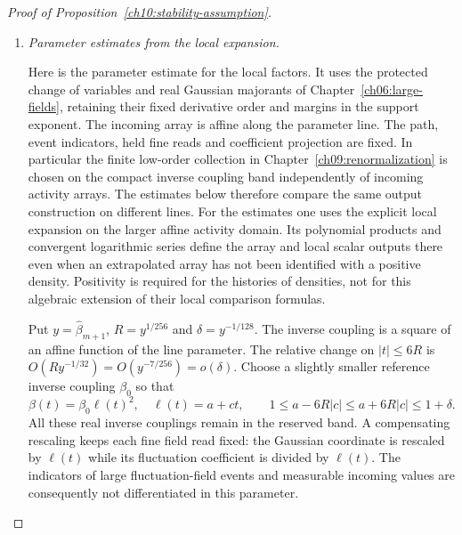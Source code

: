 \begin{proof}[Proof of Proposition~\ref{ch10:stability-assumption}]
\begin{enumerate}[label=\emph{Step \arabic*.},ref=\arabic*,leftmargin=*,align=left]
\item \emph{Parameter estimates from the local expansion.}
\label{ch10:parameter-supplier}

Here is the parameter estimate for the local factors. It uses
the protected change of variables and real Gaussian majorants of
Chapter~\ref{ch06:large-fields}, retaining their fixed derivative
order and margins in the support exponent. The incoming array is affine along the
parameter line. The path, event indicators, held fine reads and coefficient
projection are fixed. In particular the finite low-order collection in
Chapter~\ref{ch09:renormalization} is chosen on the compact inverse coupling
band independently of incoming activity arrays. The estimates below
therefore compare the same output construction on different lines.
For the estimates one uses the explicit local expansion on the larger
affine activity domain. Its polynomial products and convergent logarithmic
series define the array and local scalar outputs there even when an
extrapolated array has not been identified with a positive density.
Positivity is required for the histories of densities, not for this algebraic
extension of their local comparison formulas.

Put $y=\widehat\beta_{m+1}$, $R=y^{1/256}$ and
$\delta=y^{-1/128}$. The inverse coupling is a square of an affine function
of the line parameter. The relative change on $|t|\le6R$ is
$O(Ry^{-1/32})=O(y^{-7/256})=o(\delta)$. Choose a slightly smaller
reference inverse coupling $\beta_0$ so that
\[
 \beta(t)=\beta_0\ell(t)^2,\quad \ell(t)=a+ct,
 \qquad 1\le a-6R|c|\le a+6R|c|\le1+\delta.
\]
All these real inverse couplings remain in the reserved band. A compensating
rescaling keeps each fine field read fixed: the Gaussian coordinate is rescaled
by $\ell(t)$ while its fluctuation coefficient is divided by
$\ell(t)$. The indicators of large fluctuation-field events and measurable incoming values
are consequently not differentiated in this parameter.


\end{enumerate}
\end{proof}
